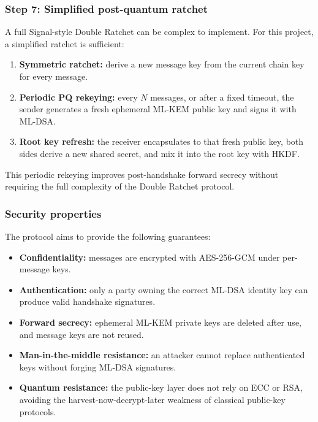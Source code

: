 \documentclass{article}
\begin{document}
      \subsubsection{Step 7: Simplified post-quantum ratchet}
      A full Signal-style Double Ratchet can be complex to implement. For this
      project, a simplified ratchet is sufficient:
      \begin{enumerate}
            \item \textbf{Symmetric ratchet:} derive a new message key from the
                  current chain key for every message.
            \item \textbf{Periodic PQ rekeying:} every $N$ messages, or after a
                  fixed timeout, the sender generates a fresh ephemeral ML-KEM
                  public key and signs it with ML-DSA.
            \item \textbf{Root key refresh:} the receiver encapsulates to that
                  fresh public key, both sides derive a new shared secret, and
                  mix it into the root key with HKDF.
      \end{enumerate}
      This periodic rekeying improves post-handshake forward secrecy without
      requiring the full complexity of the Double Ratchet protocol.

      \subsubsection{Security properties}
      The protocol aims to provide the following guarantees:
      \begin{itemize}
            \item \textbf{Confidentiality:} messages are encrypted with
                  AES-256-GCM under per-message keys.
            \item \textbf{Authentication:} only a party owning the correct
                  ML-DSA identity key can produce valid handshake signatures.
            \item \textbf{Forward secrecy:} ephemeral ML-KEM private keys are
                  deleted after use, and message keys are not reused.
            \item \textbf{Man-in-the-middle resistance:} an attacker cannot
                  replace authenticated keys without forging ML-DSA signatures.
            \item \textbf{Quantum resistance:} the public-key layer does not
                  rely on ECC or RSA, avoiding the harvest-now-decrypt-later
                  weakness of classical public-key protocols.
      \end{itemize}
\end{document}
